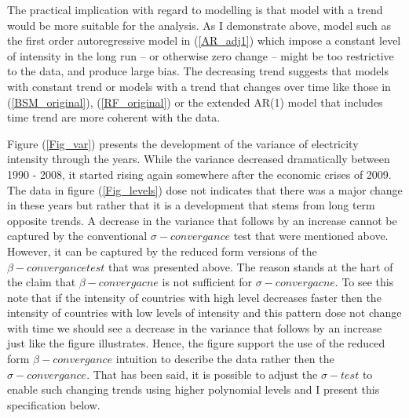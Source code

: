 \documentclass[]{amsart}
\begin{document}
\bigskip

The practical implication with regard to modelling is that model with a trend would be more suitable for the analysis. As I demonstrate above, model such as the first order autoregressive model in (\ref{AR_adj1}) which impose a constant level of intensity in the long run -- or otherwise zero change -- might be too restrictive to the data, and produce large bias. The decreasing trend suggests that models with constant trend or models with a trend that changes over time like those in (\ref{BSM_original}), (\ref{RF_original}) or the extended AR(1) model that includes time trend are more coherent with the data. 

\bigskip

Figure (\ref{Fig_var}) presents the development of the variance of electricity intensity through the years. While the variance decreased dramatically between 1990 - 2008, it started rising again somewhere after the economic crises of 2009. The data in figure (\ref{Fig_levels}) dose not indicates that there was a major change in these years but rather that it is a development that stems from long term opposite trends. A decrease in the variance that follows by an increase cannot be captured by the conventional $\sigma-convergance$ test that were mentioned above. However, it can be captured by the reduced form versions of the $\beta-convergance test$ that was presented above. The reason stands at the hart of the claim that $\beta-convergacne$ is not sufficient for $\sigma-convergacne$. To see this note that if the intensity of countries with high level decreases faster then the intensity of countries with low levels of intensity and this pattern dose not change with time we should see a decrease in the variance that follows by an increase just like the figure illustrates. Hence, the figure support the use of the reduced form $\beta-convergance$ intuition to describe the data rather then the $\sigma-convergance$. That has been said, it is possible to adjust the $\sigma-test$ to enable such changing trends using higher polynomial levels and I present this specification below.

\bigskip
\end{document}
